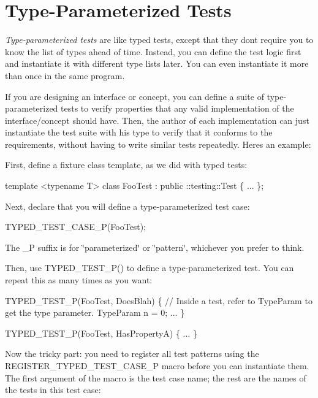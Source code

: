 \section*{Type-\/\+Parameterized Tests}

{\itshape Type-\/parameterized tests} are like typed tests, except that they don\textquotesingle{}t require you to know the list of types ahead of time. Instead, you can define the test logic first and instantiate it with different type lists later. You can even instantiate it more than once in the same program.

If you are designing an interface or concept, you can define a suite of type-\/parameterized tests to verify properties that any valid implementation of the interface/concept should have. Then, the author of each implementation can just instantiate the test suite with his type to verify that it conforms to the requirements, without having to write similar tests repeatedly. Here\textquotesingle{}s an example\+:

First, define a fixture class template, as we did with typed tests\+:


\begin{DoxyCode}
template <typename T>
class FooTest : public ::testing::Test \{
  ...
\};
\end{DoxyCode}


Next, declare that you will define a type-\/parameterized test case\+:


\begin{DoxyCode}
TYPED\_TEST\_CASE\_P(FooTest);
\end{DoxyCode}


The {\ttfamily \+\_\+P} suffix is for \char`\"{}parameterized\char`\"{} or \char`\"{}pattern\char`\"{}, whichever you prefer to think.

Then, use {\ttfamily T\+Y\+P\+E\+D\+\_\+\+T\+E\+S\+T\+\_\+\+P()} to define a type-\/parameterized test. You can repeat this as many times as you want\+:


\begin{DoxyCode}
TYPED\_TEST\_P(FooTest, DoesBlah) \{
  // Inside a test, refer to TypeParam to get the type parameter.
  TypeParam n = 0;
  ...
\}

TYPED\_TEST\_P(FooTest, HasPropertyA) \{ ... \}
\end{DoxyCode}


Now the tricky part\+: you need to register all test patterns using the {\ttfamily R\+E\+G\+I\+S\+T\+E\+R\+\_\+\+T\+Y\+P\+E\+D\+\_\+\+T\+E\+S\+T\+\_\+\+C\+A\+S\+E\+\_\+P} macro before you can instantiate them. The first argument of the macro is the test case name; the rest are the names of the tests in this test case\+:


